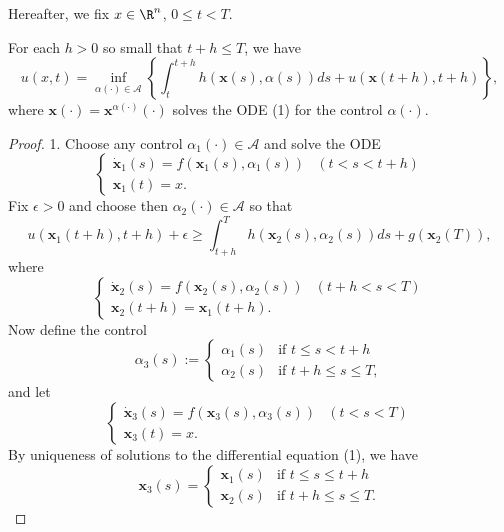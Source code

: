 Hereafter, we fix $x \in \R^n$, $0 \leq t < T$.

\begin{theorem}
\label{thm:dynamic-programming-optimality-conditions}
For each $h > 0$ so small that $t + h \leq T$, we have
\[
u(x,t) = \inf_{\alpha(\cdot) \in \mathcal{A}} \left\{ \int_t^{t+h} h(\mathbf{x}(s), \alpha(s)) ds + u(\mathbf{x}(t+h), t+h) \right\},
\tag{7}
\]
where $\mathbf{x}(\cdot) = \mathbf{x}^{\alpha(\cdot)}(\cdot)$ solves the ODE (1) for the control $\alpha(\cdot)$.
\end{theorem}
\begin{proof}
1. Choose any control $\alpha_1(\cdot) \in \mathcal{A}$ and solve the ODE
\[
\begin{cases}
\dot{\mathbf{x}}_1(s) = f(\mathbf{x}_1(s), \alpha_1(s)) & (t < s < t+h) \\
\mathbf{x}_1(t) = x.
\end{cases}
\tag{8}
\]
Fix $\epsilon > 0$ and choose then $\alpha_2(\cdot) \in \mathcal{A}$ so that
\[
u(\mathbf{x}_1(t+h), t+h) + \epsilon \geq \int_{t+h}^T h(\mathbf{x}_2(s), \alpha_2(s)) ds + g(\mathbf{x}_2(T)),
\tag{9}
\]
where
\[
\begin{cases}
\dot{\mathbf{x}}_2(s) = f(\mathbf{x}_2(s), \alpha_2(s)) & (t+h < s < T) \\
\mathbf{x}_2(t+h) = \mathbf{x}_1(t+h).
\end{cases}
\tag{10}
\]
Now define the control
\[
\alpha_3(s) := \begin{cases}
\alpha_1(s) & \text{if } t \leq s < t+h \\
\alpha_2(s) & \text{if } t+h \leq s \leq T,
\end{cases}
\tag{11}
\]
and let
\[
\begin{cases}
\dot{\mathbf{x}}_3(s) = f(\mathbf{x}_3(s), \alpha_3(s)) & (t < s < T) \\
\mathbf{x}_3(t) = x.
\end{cases}
\tag{12}
\]
By uniqueness of solutions to the differential equation (1), we have
\[
\mathbf{x}_3(s) = \begin{cases}
\mathbf{x}_1(s) & \text{if } t \leq s \leq t+h \\
\mathbf{x}_2(s) & \text{if } t+h \leq s \leq T.
\end{cases}
\tag{13}
\]


\end{proof}
